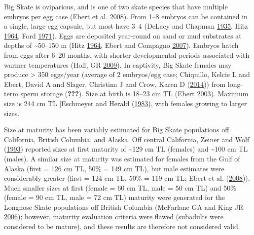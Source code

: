 \documentclass[12pt,]{article}
\begin{document}
Big Skate is oviparious, and is one of two skate species that have
multiple embryos per egg case (Ebert et al.
\protect\hyperlink{ref-Ebert2008}{2008}). From 1--8 embryos can be
contained in a single, large egg capsule, but most have 3--4 (DeLacy and
Chapman \protect\hyperlink{ref-DeLacy1935}{1935}, Hitz
\protect\hyperlink{ref-Hitz1964}{1964}, Ford
\protect\hyperlink{ref-Ford1971}{1971}). Eggs are deposited year-round
on sand or mud substrates at depths of \textasciitilde{}50--150 m (Hitz
\protect\hyperlink{ref-Hitz1964}{1964}, Ebert and Compagno
\protect\hyperlink{ref-Ebert2007}{2007}). Embryos hatch from eggs after
6--20 months, with shorter developmental periods associated with warmer
temperatures (Hoff, GR \protect\hyperlink{ref-Hoff2009}{2009}). In
captivity, Big Skate females may produce \textgreater{} 350 eggs/year
(average of 2 embryos/egg case; Chiquillo, Kelcie L and Ebert, David A
and Slager, Christina J and Crow, Karen D
(\protect\hyperlink{ref-Chiquillo2014}{2014})) from long-term sperm
storage ({\textbf{???}}). Size at birth is 18--23 cm TL (Ebert
\protect\hyperlink{ref-Ebert2003}{2003}). Maximum size is 244 cm TL
{[}Eschmeyer and Herald (\protect\hyperlink{ref-Eschmeyer1983}{1983}),
with females growing to larger sizes.

Size at maturity has been variably estimated for Big Skate populations
off California, British Columbia, and Alaska. Off central California,
Zeiner and Wolf (\protect\hyperlink{ref-ZeinerWolf1993}{1993}) reported
sizes at first maturity of \textasciitilde{}129 cm TL (females) and
\textasciitilde{}100 cm TL (males). A similar size at maturity was
estimated for females from the Gulf of Alaska (first = 126 cm TL, 50\% =
149 cm TL), but male estimates were considerably greater (first = 124 cm
TL, 50\% = 119 cm TL; Ebert et al.
(\protect\hyperlink{ref-Ebert2008}{2008})). Much smaller sizes at first
(female = 60 cm TL, male = 50 cm TL) and 50\% (female = 90 cm TL, male =
72 cm TL) maturity were generated for the Longnose Skate populations off
British Columbia (McFarlane GA and King JR
\protect\hyperlink{ref-McFandKing2006}{2006}); however, maturity
evaluation criteria were flawed (subadults were considered to be
mature), and these results are therefore not considered valid.
\end{document}
